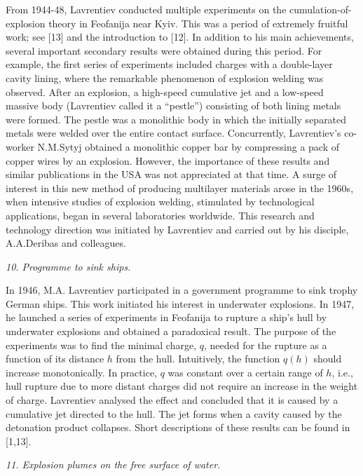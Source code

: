 \documentclass[%
 reprint,
onecolumn,
 amsmath,amssymb, aps,
]{revtex4-2}
\numberwithin{equation}{section}
\begin{document}
From 1944-48,  Lavrentiev conducted multiple experiments on the cumulation-of-explosion theory in Feofanija near Kyiv.
This was a period of extremely fruitful work; see [13] and the introduction to [12].
In addition to his main achievements, several important secondary results were obtained during this period.
For example, the first series of experiments included charges with a double-layer cavity lining, where the remarkable phenomenon of explosion welding was observed.
After an explosion, a high-speed cumulative jet and a low-speed massive body (Lavrentiev called it a ``pestle”) consisting of both lining metals were formed.
The pestle was a monolithic body in which the initially separated metals were welded over the entire contact surface.
Concurrently, Lavrentiev's co-worker N.M.Sytyj obtained a monolithic copper bar by compressing a pack of copper wires by an explosion.
However, the importance of these results and similar publications in the USA was not appreciated at that time.
A surge of interest in this new method of producing multilayer materials arose in the 1960s, when intensive studies of explosion welding, stimulated by technological applications, began in several laboratories worldwide.
This research and technology direction was initiated by Lavrentiev and carried out by his disciple, A.A.Deribas and colleagues.
\vspace{3mm}

\textit{10. Programme to sink ships.}
\vspace{1mm}

In 1946, M.A. Lavrentiev participated in a government programme to sink trophy German ships.
This work initiated his interest in underwater explosions.
In 1947, he launched a series of experiments in Feofanija to rupture a ship's hull by underwater explosions and obtained a paradoxical result.
The purpose of the experiments was to find the minimal charge, $q$, needed for the rupture as a function of its distance $h$ from the hull.
Intuitively, the function $q(h)$ should increase monotonically.
In practice,  $q$ was constant over a certain range of $h$, i.e., hull rupture due to more distant charges did not require an increase in the weight of charge.
Lavrentiev analysed the effect and concluded that it is caused by a cumulative jet directed to the hull.
The jet forms when a cavity caused by the detonation product collapses.
Short descriptions of these results can be found in [1,13].
\vspace{3mm}


\textit{11. Explosion plumes on the free surface of water.}
\vspace{1mm}
\end{document}
